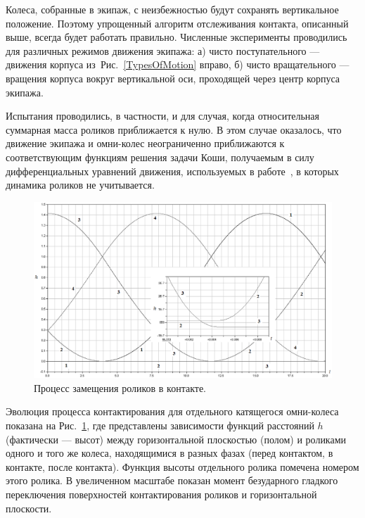\documentclass[12pt,a4paper]{article}
\begin{document}
Колеса, собранные в экипаж, с неизбежностью будут сохранять вертикальное 
положение. Поэтому упрощенный алгоритм отслеживания контакта, описанный выше,
всегда будет работать правильно. Численные эксперименты проводились для 
различных режимов движения экипажа: а) чисто поступательного --- движения 
корпуса из~Рис.~\ref{TypesOfMotion} вправо, б) чисто вращательного --- вращения 
корпуса вокруг вертикальной оси, проходящей через центр корпуса экипажа. 


Испытания проводились, в частности, и для случая, когда относительная суммарная 
масса роликов приближается к нулю. В этом случае оказалось, что движение 
экипажа и омни-колес неограниченно приближаются к соответствующим функциям 
решения задачи Коши, получаемым в силу дифференциальных уравнений движения, 
используемых в работе~\cite{BorisovKilinMamaev}, в которых динамика роликов не 
учитывается.

\begin{figure}[htb]
\centerline{\includegraphics[width=15cm]{Figure11.eps}}
\caption{Процесс замещения роликов в контакте.}
\label{fig1}
\end{figure}

Эволюция процесса контактирования для отдельного катящегося омни-колеса 
показана на Рис.~\ref{fig1}, где представлены зависимости функций расстояний 
$h$ (фактически --- высот) между горизонтальной плоскостью (полом) и роликами 
одного и того же колеса, находящимися в разных фазах (перед контактом, в 
контакте, после контакта). Функция высоты отдельного ролика помечена номером 
этого ролика. В увеличенном масштабе показан момент безударного гладкого 
переключения поверхностей контактирования роликов и горизонтальной плоскости.
\end{document}
